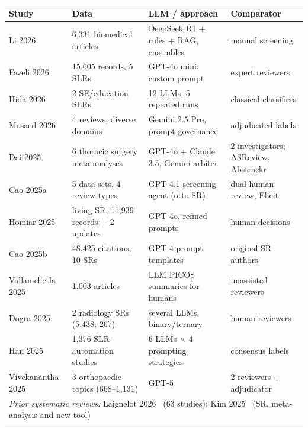 \documentclass[12pt,a4paper]{article}
\begin{document}
\begin{table}[!htb]
\small
\setlength{\tabcolsep}{4pt}
\renewcommand{\arraystretch}{1.08}
\centering
{}\label{tab:char}
\begin{tabular}{|p{2.5cm}|p{3.6cm}|p{3.6cm}|p{2.9cm}|}
\hline
Study & Data & LLM / approach & Comparator\\
\hline
Li 2026~\cite{s002} & 6,331 biomedical articles & DeepSeek R1 + rules + RAG, ensembles & manual screening\\
\hline
Fazeli 2026~\cite{s008} & 15,605 records, 5 SLRs & GPT-4o mini, custom prompt & expert reviewers\\
\hline
Hida 2026~\cite{s009} & 2 SE/education SLRs & 12 LLMs, 5 repeated runs & classical classifiers\\
\hline
Mosaed 2026~\cite{s010} & 4 reviews, diverse domains & Gemini 2.5 Pro, prompt governance & adjudicated labels\\
\hline
Dai 2025~\cite{s027} & 6 thoracic surgery meta-analyses & GPT-4o + Claude 3.5, Gemini arbiter & 2 investigators; ASReview, Abstrackr\\
\hline
Cao 2025a~\cite{s031} & 5 data sets, 4 review types & GPT-4.1 screening agent (otto-SR) & dual human review; Elicit\\
\hline
Homiar 2025~\cite{s032} & living SR, 11,939 records + 2 updates & GPT-4o, refined prompts & human decisions\\
\hline
Cao 2025b~\cite{s033} & 48,425 citations, 10 SRs & GPT-4 prompt templates & original SR authors\\
\hline
Vallamchetla 2025~\cite{s034} & 1,003 articles & LLM PICOS summaries for humans & unassisted reviewers\\
\hline
Dogra 2025~\cite{s035} & 2 radiology SRs (5,438; 267) & several LLMs, binary/ternary & human reviewers\\
\hline
Han 2025~\cite{s036} & 1,376 SLR-automation studies & 6 LLMs $\times$ 4 prompting strategies & consensus labels\\
\hline
Vivekanantha 2025~\cite{s038} & 3 orthopaedic topics (668--1,131) & GPT-5 & 2 reviewers + adjudicator\\
\hline
\multicolumn{4}{|p{13.3cm}|}{\textit{Prior systematic reviews:} Laignelot 2026~\cite{s014} (63 studies); Kim 2025~\cite{s037} (SR, meta-analysis and new tool)}\\
\hline
\end{tabular}
\end{table}
\end{document}
